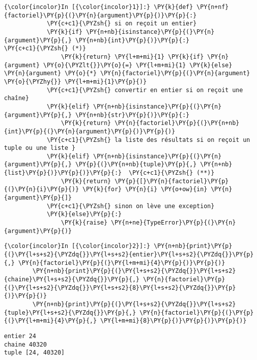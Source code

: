     \begin{Verbatim}[commandchars=\\\{\}]
{\color{incolor}In [{\color{incolor}1}]:} \PY{k}{def} \PY{n+nf}{factoriel}\PY{p}{(}\PY{n}{argument}\PY{p}{)}\PY{p}{:}
            \PY{c+c1}{\PYZsh{} si on reçoit un entier}
            \PY{k}{if} \PY{n+nb}{isinstance}\PY{p}{(}\PY{n}{argument}\PY{p}{,} \PY{n+nb}{int}\PY{p}{)}\PY{p}{:}              \PY{c+c1}{\PYZsh{} (*)}
                \PY{k}{return} \PY{l+m+mi}{1} \PY{k}{if} \PY{n}{argument} \PY{o}{\PYZlt{}}\PY{o}{=} \PY{l+m+mi}{1} \PY{k}{else} \PY{n}{argument} \PY{o}{*} \PY{n}{factoriel}\PY{p}{(}\PY{n}{argument} \PY{o}{\PYZhy{}} \PY{l+m+mi}{1}\PY{p}{)}
            \PY{c+c1}{\PYZsh{} convertir en entier si on reçoit une chaîne}
            \PY{k}{elif} \PY{n+nb}{isinstance}\PY{p}{(}\PY{n}{argument}\PY{p}{,} \PY{n+nb}{str}\PY{p}{)}\PY{p}{:}
                \PY{k}{return} \PY{n}{factoriel}\PY{p}{(}\PY{n+nb}{int}\PY{p}{(}\PY{n}{argument}\PY{p}{)}\PY{p}{)}
            \PY{c+c1}{\PYZsh{} la liste des résultats si on reçoit un tuple ou une liste }
            \PY{k}{elif} \PY{n+nb}{isinstance}\PY{p}{(}\PY{n}{argument}\PY{p}{,} \PY{p}{(}\PY{n+nb}{tuple}\PY{p}{,} \PY{n+nb}{list}\PY{p}{)}\PY{p}{)}\PY{p}{:}  \PY{c+c1}{\PYZsh{} (**)}
                \PY{k}{return} \PY{p}{[}\PY{n}{factoriel}\PY{p}{(}\PY{n}{i}\PY{p}{)} \PY{k}{for} \PY{n}{i} \PY{o+ow}{in} \PY{n}{argument}\PY{p}{]}
            \PY{c+c1}{\PYZsh{} sinon on lève une exception}
            \PY{k}{else}\PY{p}{:}
                \PY{k}{raise} \PY{n+ne}{TypeError}\PY{p}{(}\PY{n}{argument}\PY{p}{)}
\end{Verbatim}


    \begin{Verbatim}[commandchars=\\\{\}]
{\color{incolor}In [{\color{incolor}2}]:} \PY{n+nb}{print}\PY{p}{(}\PY{l+s+s2}{\PYZdq{}}\PY{l+s+s2}{entier}\PY{l+s+s2}{\PYZdq{}}\PY{p}{,} \PY{n}{factoriel}\PY{p}{(}\PY{l+m+mi}{4}\PY{p}{)}\PY{p}{)}
        \PY{n+nb}{print}\PY{p}{(}\PY{l+s+s2}{\PYZdq{}}\PY{l+s+s2}{chaine}\PY{l+s+s2}{\PYZdq{}}\PY{p}{,} \PY{n}{factoriel}\PY{p}{(}\PY{l+s+s2}{\PYZdq{}}\PY{l+s+s2}{8}\PY{l+s+s2}{\PYZdq{}}\PY{p}{)}\PY{p}{)}
        \PY{n+nb}{print}\PY{p}{(}\PY{l+s+s2}{\PYZdq{}}\PY{l+s+s2}{tuple}\PY{l+s+s2}{\PYZdq{}}\PY{p}{,} \PY{n}{factoriel}\PY{p}{(}\PY{p}{(}\PY{l+m+mi}{4}\PY{p}{,} \PY{l+m+mi}{8}\PY{p}{)}\PY{p}{)}\PY{p}{)}
\end{Verbatim}


    \begin{Verbatim}[commandchars=\\\{\}]
entier 24
chaine 40320
tuple [24, 40320]

    \end{Verbatim}

